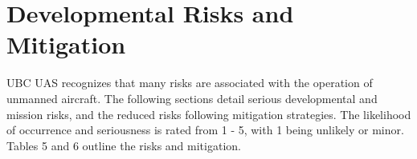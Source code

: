 \section{Developmental Risks and Mitigation}
\label{sec3:risk}
UBC UAS recognizes that many risks are associated with the operation of unmanned aircraft. The following sections detail serious developmental and mission risks, and the reduced risks following mitigation strategies. The likelihood of occurrence and seriousness is rated from 1 - 5, with 1 being unlikely or minor. Tables 5 and 6 outline the risks and mitigation.  









        
        
        
        
